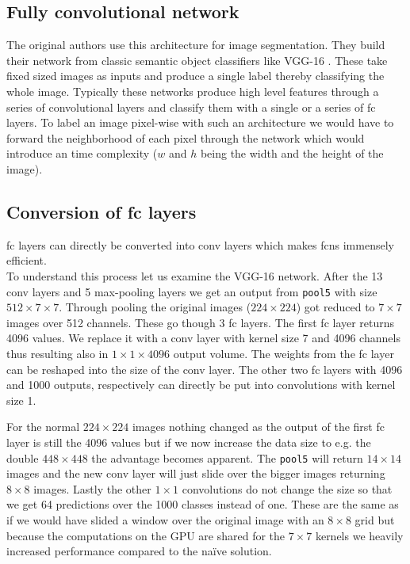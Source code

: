 \subsection{Fully convolutional network} %
\label{sub:conepts:fcn:fcn}
The original authors use this architecture for image segmentation. They build their network from classic semantic object classifiers like VGG-16 \citep{simonyan_very_2014}. These take fixed sized images as inputs and produce a single label thereby classifying the whole image. Typically these networks produce high level features through a series of convolutional layers and classify them with a single or a series of \gls{fc} layers. To label an image pixel-wise with such an architecture we would have to forward the neighborhood of each pixel through the network which would introduce an  time complexity ($w$ and $h$ being the width and the height of the image).

\subsection{Conversion of \gls{fc} layers}
\label{sub:concepts:fcn:fc_conversion}
\gls{fc} layers can directly be converted into \gls{conv} layers which makes \glspl{fcn} immensely efficient.\\
To understand this process let us examine the VGG-16 network. After the 13 \gls{conv} layers and 5 max-pooling layers we get an output from \texttt{pool5} with size $512\times7\times7$. Through pooling the original images ($224\times224$) got reduced to $7\times7$ images over 512 channels. These go though 3 \gls{fc} layers. The first \gls{fc} layer returns 4096 values. We replace it with a \gls{conv} layer with kernel size 7 and 4096 channels thus resulting also in $1\times1\times4096$ output volume. The weights from the \gls{fc} layer can be reshaped into the size of the \gls{conv} layer. The other two \gls{fc} layers with 4096 and 1000 outputs, respectively can directly be put into convolutions with kernel size 1.

For the normal $224\times224$ images nothing changed as the output of the first \gls{fc} layer is still the 4096 values but if we now increase the data size to e.g. the double $448\times448$ the advantage becomes apparent. The \texttt{pool5} will return $14\times14$ images and the new \gls{conv} layer will just slide over the bigger images returning $8\times8$ images. Lastly the other $1\times1$ convolutions do not change the size so that we get 64 predictions over the 1000 classes instead of one. These are the same as if we would have slided a window over the original image with an $8\times8$ grid but because the computations on the GPU are shared for the $7\times7$ kernels we heavily increased performance compared to the naïve solution.

